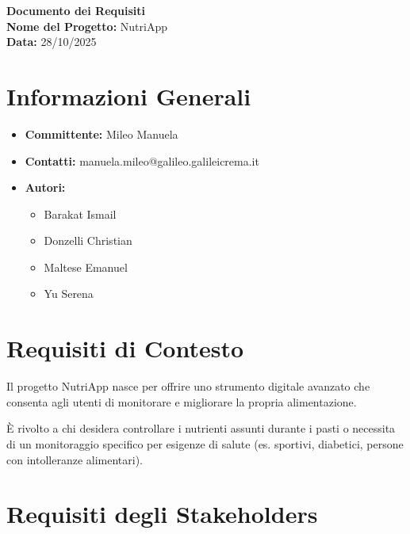 \documentclass[11pt,a4paper]{article}
\begin{document}
    \begin{center}
        {\Large \textbf{Documento dei Requisiti}} \\
        \vspace{0.5cm}
        \textbf{Nome del Progetto:} NutriApp \\
        \textbf{Data:} 28/10/2025
    \end{center}

    \section*{Informazioni Generali}

    \begin{itemize}
        \item \textbf{Committente:} Mileo Manuela
        \item \textbf{Contatti:} manuela.mileo@galileo.galileicrema.it
        \item \textbf{Autori:}

        \begin{itemize}
            \item Barakat Ismail
            \item Donzelli Christian
            \item Maltese Emanuel
            \item Yu Serena
        \end{itemize}

    \end{itemize}


    \section*{Requisiti di Contesto}

    Il progetto NutriApp nasce per offrire uno strumento digitale avanzato che consenta agli utenti di monitorare e migliorare la propria alimentazione.

    È rivolto a chi desidera controllare i nutrienti assunti durante i pasti o necessita di un monitoraggio specifico per esigenze di salute (es. sportivi, diabetici, persone con intolleranze alimentari).


    \section*{Requisiti degli Stakeholders}
\end{document}
